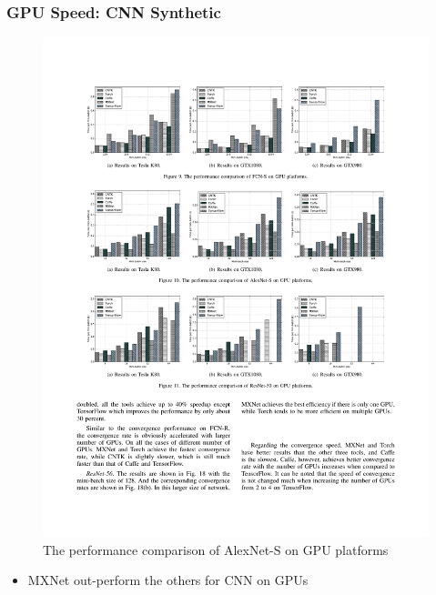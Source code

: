 \begin{frame}
	\MyLogo
	\frametitle{GPU Speed: CNN Synthetic}

	\begin{figure}[htbp] 
		\includegraphics[width=\linewidth]{figures/AlexNet-S2.pdf} 
		\caption{The performance comparison of AlexNet-S on GPU platforms}
	\end{figure}

\pause

\vskip -10pt
\begin{mdframed}[style=mystyle1]
\begin{itemize}
\item MXNet out-perform the others for CNN on GPUs
\end{itemize}
\end{mdframed}

\end{frame}


